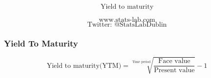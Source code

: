 \documentclass{beamer}
\begin{document}
\begin{frame}
\bigskip
{
\Huge
\[ \mbox{Yield to maturity} \]

}
{
\LARGE
\[ \mbox{www.stats-lab.com} \]
\[ \mbox{Twitter: @StatsLabDublin} \]
}
\end{frame}
\begin{frame}
\frametitle{Yield To Maturity}
\[
\text{Yield to maturity(YTM)} = \sqrt[\text{Time period}]{\dfrac{\text{Face value}}{\text{Present value}}} - 1 
\]
\end{frame}

\end{document}
